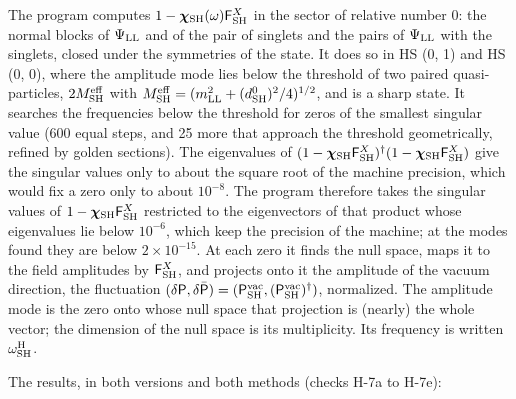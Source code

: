 \documentclass[
  10pt,
]{article}
\begin{document}
The program computes
\(1-\boldsymbol\chi_{\rm SH}(\omega)\mathsf F^X_{\rm SH}\) in the sector
of relative number 0: the normal blocks of \(\Psi_{\rm LL}\) and of the
pair of singlets and the pairs of \(\Psi_{\rm LL}\) with the singlets,
closed under the symmetries of the state. It does so in HS (0, 1) and HS
(0, 0), where the amplitude mode lies below the threshold of two paired
quasi-particles, \(2M^{\rm eff}_{\rm SH}\) with
\(M^{\rm eff}_{\rm SH}=(m_{\rm LL}^2+(d^0_{\rm SH})^2/4)^{1/2}\), and is
a sharp state. It searches the frequencies below the threshold for zeros
of the smallest singular value (600 equal steps, and 25 more that
approach the threshold geometrically, refined by golden sections). The
eigenvalues of
\((1-\boldsymbol\chi_{\rm SH}\mathsf F^X_{\rm SH})^\dagger(1-\boldsymbol\chi_{\rm SH}\mathsf F^X_{\rm SH})\)
give the singular values only to about the square root of the machine
precision, which would fix a zero only to about \(10^{-8}\). The program
therefore takes the singular values of
\(1-\boldsymbol\chi_{\rm SH}\mathsf F^X_{\rm SH}\) restricted to the
eigenvectors of that product whose eigenvalues lie below \(10^{-6}\),
which keep the precision of the machine; at the modes found they are
below \(2\times10^{-15}\). At each zero it finds the null space, maps it
to the field amplitudes by \(\mathsf F^X_{\rm SH}\), and projects onto
it the amplitude of the vacuum direction, the fluctuation
\((\delta\mathsf P,\delta\bar{\mathsf P})=(\mathsf P^{\rm vac}_{\rm SH},(\mathsf P^{\rm vac}_{\rm SH})^\dagger)\),
normalized. The amplitude mode is the zero onto whose null space that
projection is (nearly) the whole vector; the dimension of the null space
is its multiplicity. Its frequency is written
\(\omega^{\rm H}_{\rm SH}\).

The results, in both versions and both methods (checks H-7a to H-7e):
\end{document}
